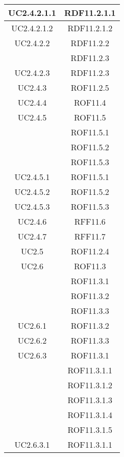 \begin{longtable}{|c|c|}
\midrule
UC2.4.2.1.1
& RDF11.2.1.1\\

\midrule
UC2.4.2.1.2
& RDF11.2.1.2\\

\midrule
UC2.4.2.2
& RDF11.2.2\\
& RDF11.2.3\\

\midrule
UC2.4.2.3
& RDF11.2.3\\

\midrule
UC2.4.3
& ROF11.2.5\\

\midrule
UC2.4.4
& ROF11.4\\

\midrule
UC2.4.5
& ROF11.5\\
& ROF11.5.1\\
& ROF11.5.2\\
& ROF11.5.3\\

\midrule
UC2.4.5.1
& ROF11.5.1\\

\midrule
UC2.4.5.2
& ROF11.5.2\\

\midrule
UC2.4.5.3
& ROF11.5.3\\

\midrule
UC2.4.6
& RFF11.6\\

\midrule
UC2.4.7
& RFF11.7\\

\midrule
UC2.5
& ROF11.2.4\\

\midrule
UC2.6
& ROF11.3\\
& ROF11.3.1\\
& ROF11.3.2\\
& ROF11.3.3\\

\midrule
UC2.6.1
& ROF11.3.2\\

\midrule
UC2.6.2
& ROF11.3.3\\

\midrule
UC2.6.3
& ROF11.3.1\\
& ROF11.3.1.1\\
& ROF11.3.1.2\\
& ROF11.3.1.3\\
& ROF11.3.1.4\\
& ROF11.3.1.5\\

\midrule
UC2.6.3.1
& ROF11.3.1.1\\


\end{longtable}
